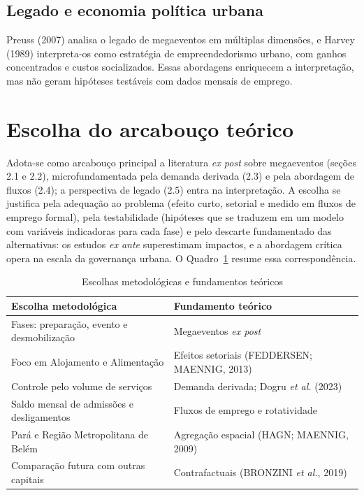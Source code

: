\documentclass[12pt,a4paper]{article}
\begin{document}
\subsection{Legado e economia política urbana}

Preuss (2007) analisa o legado de megaeventos em múltiplas dimensões, e Harvey
(1989) interpreta-os como estratégia de empreendedorismo urbano, com ganhos
concentrados e custos socializados. Essas abordagens enriquecem a
interpretação, mas não geram hipóteses testáveis com dados mensais de emprego.

\section{Escolha do arcabouço teórico}

Adota-se como arcabouço principal a literatura \textit{ex post} sobre
megaeventos (seções 2.1 e 2.2), microfundamentada pela demanda derivada (2.3)
e pela abordagem de fluxos (2.4); a perspectiva de legado (2.5) entra na
interpretação. A escolha se justifica pela adequação ao problema (efeito curto,
setorial e medido em fluxos de emprego formal), pela testabilidade (hipóteses
que se traduzem em um modelo com variáveis indicadoras para cada fase) e pelo
descarte fundamentado das alternativas: os estudos \textit{ex ante}
superestimam impactos, e a abordagem crítica opera na escala da governança
urbana. O Quadro~\ref{tab:arcabouco} resume essa correspondência.

\begin{table}[h]
  \centering
  \caption{Escolhas metodológicas e fundamentos teóricos}
  \label{tab:arcabouco}
  \small
  \begin{tabularx}{\textwidth}{Xl}
    \toprule
    \textbf{Escolha metodológica} & \textbf{Fundamento teórico} \\
    \midrule
    Fases: preparação, evento e desmobilização & Megaeventos \textit{ex post} \\
    Foco em Alojamento e Alimentação & Efeitos setoriais (FEDDERSEN; MAENNIG, 2013) \\
    Controle pelo volume de serviços & Demanda derivada; Dogru \textit{et al.} (2023) \\
    Saldo mensal de admissões e desligamentos & Fluxos de emprego e rotatividade \\
    Pará e Região Metropolitana de Belém & Agregação espacial (HAGN; MAENNIG, 2009) \\
    Comparação futura com outras capitais & Contrafactuais (BRONZINI \textit{et al.}, 2019) \\
    \bottomrule
  \end{tabularx}
\end{table}
\end{document}
